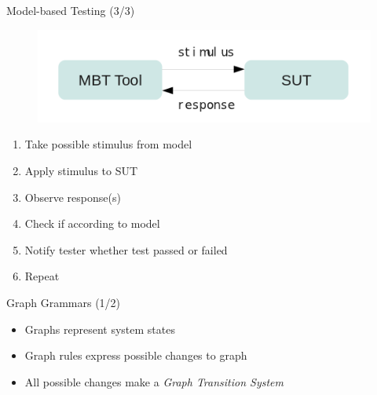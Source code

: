 \documentclass{FMTslides}
\begin{document}
\begin{frame}{Model-based Testing (3/3)}
\begin{figure}
\includegraphics[scale=0.75]{./figures/mbt.png}
\end{figure}
\begin{enumerate}
\item Take possible stimulus from model
\item Apply stimulus to SUT
\item Observe response(s)
\item Check if according to model
\item Notify tester whether test passed or failed
\item Repeat
\end{enumerate}
\end{frame}

\begin{frame}{Graph Grammars (1/2)}
\begin{figure}
\centering
    \hspace{10px}
\end{figure}

\begin{itemize}
  \item Graphs represent system states
  \item Graph rules express possible changes to graph
  \item All possible changes make a \textit{Graph Transition System}
\end{itemize}
\end{frame}
\end{document}

